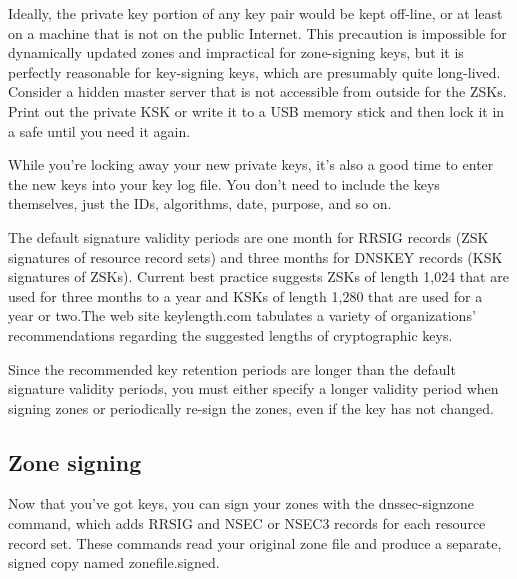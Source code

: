 Ideally, the private key portion of any key pair would be kept off-line,
or at least on a machine that is not on the public Internet. This
precaution is impossible for dynamically updated zones and impractical
for zone-signing keys, but it is perfectly reasonable for key-signing
keys, which are presumably quite long-lived. Consider a hidden master
server that is not accessible from outside for the ZSKs. Print out the
private KSK or write it to a USB memory stick and then lock it in a safe
until you need it again.

While you're locking away your new private keys, it's also a good time
to enter the new keys into your key log file. You don't need to include
the keys themselves, just the IDs, algorithms, date, purpose, and so on.

The default signature validity periods are one month for RRSIG records
(ZSK signatures of resource record sets) and three months for DNSKEY
records (KSK signatures of ZSKs). Current best practice suggests ZSKs of
length 1,024 that are used for three months to a year and KSKs of length
1,280 that are used for a year or two.The web site keylength.com
tabulates a variety of organizations' recommendations regarding the
suggested lengths of cryptographic keys.

Since the recommended key retention periods are longer than the default
signature validity periods, you must either specify a longer validity
period when signing zones or periodically re-sign the zones, even if the
key has not changed.

\protect\hypertarget{part0024_split_064.html}{}{}

\hypertarget{part0024_split_064.htmlux5cux23_idContainer1069}{}
\hypertarget{part0024_split_064.htmlux5cux23calibre_pb_63}{%
\subsection[Zone
signing]{\texorpdfstring{\protect\hypertarget{part0024_split_064.htmlux5cux23_idTextAnchor943}{}{}Zone
signing}{Zone signing}}\label{part0024_split_064.htmlux5cux23calibre_pb_63}}

\protect\hypertarget{part0024_split_064.htmlux5cux23_idIndexMarker2264}{}{}\protect\hypertarget{part0024_split_064.htmlux5cux23_idIndexMarker2265}{}{}Now
that you've got keys, you can sign your zones with the {dnssec-signzone}
command, which adds RRSIG and NSEC or NSEC3 records for each resource
record set. These commands read your original zone file and produce a
separate, signed copy named {zonefile}{.signed}.

